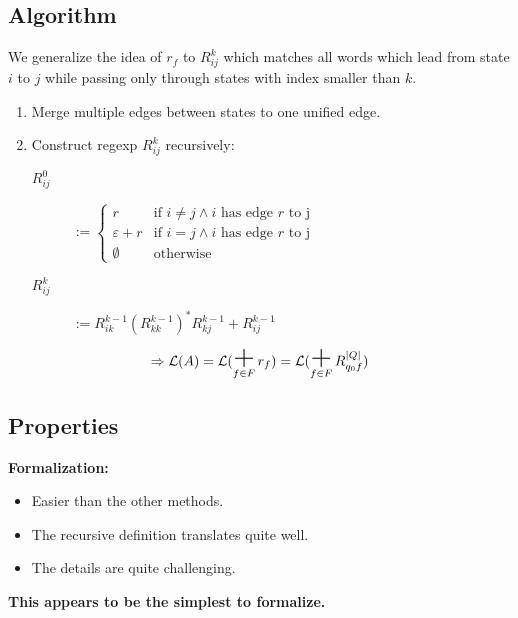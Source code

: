 \documentclass{beamer}
\DeclareMathOperator*{\bigplus}{\mbox{\huge +}}
\begin{document}
\subsection*{Algorithm}
\begin{frame}

    We generalize the idea of $r_f$ to $R^k_{i j}$ which matches all words which lead from state $i$ to $j$ while passing only through states with index smaller than $k$.

    \begin{enumerate}
        \item 
            Merge multiple edges between states to one unified edge.
        \item
            Construct regexp $R^k_{i j}$ recursively:

            \begin{description}

                \item[$R^0_{i j}$]
                    $ := \begin{cases} 
                        r & \mbox{if } i \neq j \wedge i \mbox{ has edge } r \mbox{ to j}  \\
          \varepsilon + r & \mbox{if } i = j \wedge i \mbox{ has edge } r \mbox{ to j}  \\
                \emptyset & \mbox{otherwise}
                    \end{cases}
                    $ 

                \item[$R^k_{i j}$]
                    $ := R^{k-1}_{i k} (R^{k-1}_{k k})^* R^{k-1}_{k j} + R^{k-1}_{i j}$

            \end{description}

    \end{enumerate}

    \[ 
        \Rightarrow \mathcal{L}(A) = \mathcal{L}(\bigplus_{f \in F} r_f) = \mathcal{L}(\bigplus_{f \in F} R^{|Q|}_{q_0 f}) 
    \]

\end{frame}

\subsection*{Properties}
\begin{frame}
    \textbf{Formalization:} \\
    \begin{itemize}
        \item
            Easier than the other methods.\\
        \item
            The recursive definition translates quite well.\\
        \item
            The details are quite challenging.
    \end{itemize} 

    \pause

    {\centering 
        \textbf{This appears to be the simplest to formalize.}

    }
\end{frame}
\end{document}

